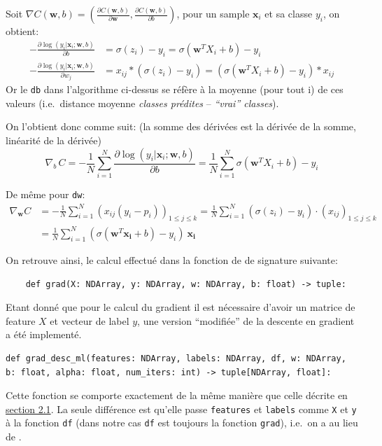 \documentclass[
]{article}
\begin{document}
Soit
\(\nabla C(\mathbf{w},b) = (\frac{\partial C(\mathbf{w},b)}{\partial \mathbf{w}}, \frac{\partial C(\mathbf{w},b)}{\partial b} )\),
pour un sample \(\mathbf{x}_i\) et sa classe \(y_i\), on obtient:
\begin{align*}
-\frac{\partial \log(y_i|\mathbf{x}_i ; \mathbf{w}, b)}{\partial b} 
&= \sigma(z_i) - y_i
= \sigma(\mathbf{w}^T X_i + b) - y_i\\
%
-\frac{\partial \log(y_i|\mathbf{x}_i ; \mathbf{w}, b)}{\partial w_j} 
&= x_{ij}* ( \sigma(z_i) - y_i) 
= (\sigma(\mathbf{w}^T X_i + b) - y_i) * x_{ij}
\end{align*} Or le \texttt{db} dans l'algorithme ci-dessus se réfère à
la moyenne (pour tout i) de ces valeurs (i.e.~distance moyenne
\emph{classes prédites} -- \emph{``vrai'' classes}).

On l'obtient donc comme suit: (la somme des dérivées est la dérivée de
la somme, linéarité de la dérivée)
\[\nabla_b\, {C} =-\frac{1}{N} \sum_{i = 1}^{N}{ \frac{\partial \log(y_i|\mathbf{x}_i ; \mathbf{w}, b)}{\partial b} =  \frac{1}{N} \sum_{i=1}^N{\sigma(\mathbf{w}^T X_i + b) - y_i}}\]

De même pour \texttt{dw}: \begin{align*}
  \nabla_{\mathbf{w}} C & = -\frac{1}{N} \sum_{i = 1}^{N}(x_{ij}(y_i - p_i))_{1 \leq j \leq k} 
  = \frac{1}{N} \sum_{i=1}^N(\sigma(z_i) - y_i)\cdot (x_{ij})_{1 \leq j\leq k} \\
%
& =\frac{1}{N}\sum_{i = 1}^N (\sigma(\mathbf{w}^T\mathbf{x_i} + b) - y_i)\ \mathbf{x_i}
\end{align*}

On retrouve ainsi, le calcul effectué dans la fonction  de
 de signature suivante:

\begin{lstlisting}
    def grad(X: NDArray, y: NDArray, w: NDArray, b: float) -> tuple:
\end{lstlisting}

Etant donné que pour le calcul du gradient il est nécessaire d'avoir un
matrice de feature \(X\) et vecteur de label \(y\), une version
``modifiée'' de la descente en gradient a été implementé.

\begin{lstlisting}
def grad_desc_ml(features: NDArray, labels: NDArray, df, w: NDArray, b: float, alpha: float, num_iters: int) -> tuple[NDArray, float]:
\end{lstlisting}

Cette fonction se comporte exactement de la même manière que celle
décrite en \href{#gradient-descent}{section 2.1}. La seule différence
est qu'elle passe \texttt{features} et \texttt{labels} comme \texttt{X}
et \texttt{y} à la fonction \texttt{df} (dans notre cas \texttt{df} est
toujours la fonction \texttt{grad}), i.e.~on a
 au lieu de .
\end{document}
